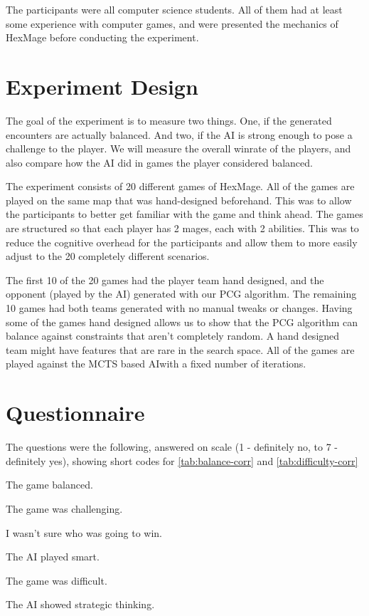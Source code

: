 The participants were all computer science students. All of them had at least
some experience with computer games, and were presented the mechanics of HexMage
before conducting the experiment.

\section{Experiment Design}

The goal of the experiment is to measure two things. One, if the generated
encounters are actually balanced. And two, if the AI is strong enough to pose a
challenge to the player. We will measure the overall winrate of the players,
and also compare how the AI did in games the player considered balanced.

The experiment consists of 20 different games of HexMage. All of the games are
played on the same map that was hand-designed beforehand. This was to allow the
participants to better get familiar with the game and think ahead. The games
are structured so that each player has 2 mages, each with 2 abilities. This was
to reduce the cognitive overhead for the participants and allow them to more easily
adjust to the 20 completely different scenarios.

The first 10 of the 20 games had the player team hand designed, and the
opponent (played by the AI) generated with our PCG algorithm. The remaining 10
games had both teams generated with no manual tweaks or changes. Having some of
the games hand designed allows us to show that the PCG algorithm can balance
against constraints that aren't completely random. A hand designed team might
have features that are rare in the search space. All of the games are played
against the MCTS based AI\@ with a fixed number of iterations.

\section{Questionnaire}

The questions were the following, answered on scale (1 - definitely no, to 7 - definitely yes), showing short codes for \autoref{tab:balance-corr} and \autoref{tab:difficulty-corr}

\begin{description}[]
	\item[Balanced:] The game balanced.
	\item[Challenge:] The game was challenging.
	\item[Unsure:] I wasn't sure who was going to win.
	\item[Smart:] The AI played smart.
	\item[Difficult:] The game was difficult.
	\item[Strategy:] The AI showed strategic thinking.
\end{description}

